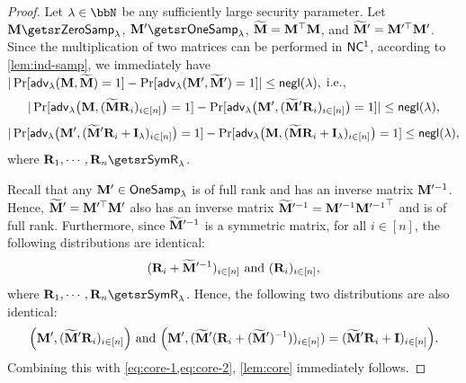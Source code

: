 \begin{proof}
Let $\lambda\in\N$ be any sufficiently large security parameter. Let $\matr M\getsr\zs$, $\matr M'\getsr\os$, $\widetilde{\mathbf{{M}}}=\mathbf{{M}}^\top\mathbf{{M}}$, and $\widetilde{\mathbf{{M}}}'=\mathbf{{M}}'^\top\mathbf{{M}}'$.
Since the multiplication of two matrices can be performed in $\mathsf{NC^1}$, according to \cref{lem:ind-samp}, we immediately have
$|\Pr[{\mathsf{adv}}_\lambda(\mathbf{{M}},\widetilde{\mathbf{{M}}})=1]-\Pr[{\mathsf{adv}}_\lambda(\mathbf{{M}}',\widetilde{\mathbf{{M}}}')=1]|\leq\mathsf{negl}(\lambda),$ i.e.,
\begin{equation}
\label{eq:core-1}
|\Pr[{\mathsf{adv}}_\lambda\big(\mathbf{{M}},(\widetilde{\mathbf{{M}}}{\mathbf{{R}}}_i)_{i\in[n]}\big)=1]-\Pr[{\mathsf{adv}}_\lambda\big(\mathbf{{M}}',(\widetilde{\mathbf{{M}}}'{\mathbf{{R}}}_i)_{i\in[n]}\big)=1] |\leq\mathsf{negl}(\lambda),
\end{equation}
\begin{equation}
\label{eq:core-2}
|\Pr[{\mathsf{adv}}_\lambda\big(\mathbf{{M}}',(\widetilde{\mathbf{{M}}}'{\mathbf{{R}}}_i+{\mathbf{{I}}}_{\lambda})_{i\in[n]}\big)=1]-\Pr[{\mathsf{adv}}_\lambda\big(\mathbf{{M}},(\widetilde{\mathbf{{M}}}{\mathbf{{R}}}_i+{\mathbf{{I}}}_{\lambda})_{i\in[n]}\big)=1]\leq\mathsf{negl}(\lambda),
\end{equation}
where $\sR_1,\cdots,\sR_n\getsr\sr$.




Recall that any $\mathbf{{M}}'\in{\mathsf{OneSamp}}_\lambda$ is of full rank and has an inverse matrix $\mathbf{{M}}'^{-1}$. Hence,
$\widetilde{\mathbf{{M}}}'=\mathbf{{M}}'^\top\mathbf{{M}}'$ also has an inverse matrix $\widetilde{\mathbf{{M}}}'^{-1}=\mathbf{{M}}'^{-1}{\mathbf{{M}}'^{-1}}^\top$ and is of full rank. Furthermore, since $\widetilde{\mathbf{{M}}}'^{-1}$ is a symmetric matrix, for all $i\in[n]$, the following distributions are identical:
$$(\sR_i+\sM'^{-1})_{i\in[n]}\ \mbox{and}\ (\sR_i)_{i\in[n]},$$
where $\sR_1,\cdots,\sR_n\getsr\sr$. Hence, the following two distributions are also identical:
$$\Big(\matr M',(\sM'\sR_i)_{i\in[n]}\Big) \ \mbox{and}\ \Big(\matr M',(\sM'(\sR_i+(\sM')^{-1}))_{i\in[n]})=(\sM'\sR_i+\matr I)_{i\in[n]}\Big).$$
Combining this with \cref{eq:core-1,eq:core-2}, \cref{lem:core} immediately follows.
\end{proof}

